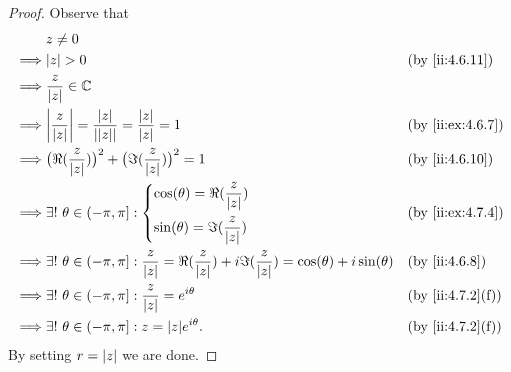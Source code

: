 \begin{proof}
  Observe that
  \begin{align*}
             & z \neq 0                                                                                                                                                          \\
    \implies & \abs{z} > 0                                                                                                                                 &  & \by{ii:4.6.11}   \\
    \implies & \dfrac{z}{\abs{z}} \in \C                                                                                                                                         \\
    \implies & \abs{\dfrac{z}{\abs{z}}} = \dfrac{\abs{z}}{\abs{\abs{z}}} = \dfrac{\abs{z}}{\abs{z}} = 1                                                    &  & \by{ii:ex:4.6.7} \\
    \implies & \big(\Re(\dfrac{z}{\abs{z}})\big)^2 + \big(\Im(\dfrac{z}{\abs{z}})\big)^2 = 1                                                               &  & \by{ii:4.6.10}   \\
    \implies & \exists!\ \theta \in (-\pi, \pi] : \begin{dcases}
                                                    \cos(\theta) = \Re(\dfrac{z}{\abs{z}}) \\
                                                    \sin(\theta) = \Im(\dfrac{z}{\abs{z}})
                                                  \end{dcases}                                                                    &  & \by{ii:ex:4.7.4}                          \\
    \implies & \exists!\ \theta \in (-\pi, \pi] : \dfrac{z}{\abs{z}} = \Re(\dfrac{z}{\abs{z}}) + i \Im(\dfrac{z}{\abs{z}}) = \cos(\theta) + i \sin(\theta) &  & \by{ii:4.6.8}    \\
    \implies & \exists!\ \theta \in (-\pi, \pi] : \dfrac{z}{\abs{z}} = e^{i \theta}                                                                        &  & \by{ii:4.7.2}[f] \\
    \implies & \exists!\ \theta \in (-\pi, \pi] : z = \abs{z} e^{i \theta}.                                                                                &  & \by{ii:4.7.2}[f]
  \end{align*}
  By setting \(r = \left\lvert z\right\rvert\) we are done.
\end{proof}

